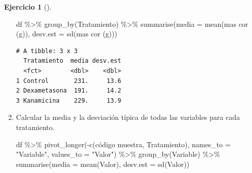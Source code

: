 \documentclass[
  a4paper,
]{scrreport}
\newenvironment{Shaded}{\begin{snugshade}}{\end{snugshade}}
\newcommand{\AttributeTok}[1]{\textcolor[rgb]{0.40,0.45,0.13}{#1}}
\newcommand{\FunctionTok}[1]{\textcolor[rgb]{0.28,0.35,0.67}{#1}}
\newcommand{\NormalTok}[1]{\textcolor[rgb]{0.00,0.23,0.31}{#1}}
\newcommand{\SpecialCharTok}[1]{\textcolor[rgb]{0.37,0.37,0.37}{#1}}
\newcommand{\StringTok}[1]{\textcolor[rgb]{0.13,0.47,0.30}{#1}}
\theoremstyle{definition}
\newtheorem{exercise}{Ejercicio}[chapter]
\theoremstyle{definition}
\theoremstyle{remark}
\begin{document}
\begin{exercise}[]
\begin{enumerate}
\begin{tcolorbox}
\begin{Shaded}
\begin{Highlighting}[]
\NormalTok{df }\SpecialCharTok{\%\textgreater{}\%}
    \FunctionTok{group\_by}\NormalTok{(Tratamiento) }\SpecialCharTok{\%\textgreater{}\%}
    \FunctionTok{summarise}\NormalTok{(}\AttributeTok{media =} \FunctionTok{mean}\NormalTok{(}\StringTok{\textasciigrave{}}\AttributeTok{mas cor (g)}\StringTok{\textasciigrave{}}\NormalTok{), }\AttributeTok{desv.est =} \FunctionTok{sd}\NormalTok{(}\StringTok{\textasciigrave{}}\AttributeTok{mas cor (g)}\StringTok{\textasciigrave{}}\NormalTok{))}
\end{Highlighting}
\end{Shaded}

\begin{verbatim}
# A tibble: 3 x 3
  Tratamiento  media desv.est
  <fct>        <dbl>    <dbl>
1 Control       231.     13.6
2 Dexametasona  191.     14.2
3 Kanamicina    229.     13.9
\end{verbatim}

  \end{tcolorbox}
\item
  Calcular la media y la desviación típica de todas las variables para
  cada tratamiento.

  \begin{tcolorbox}[enhanced jigsaw, title=\textcolor{quarto-callout-note-color}{\faInfo}\hspace{0.5em}{Solución}, titlerule=0mm, toprule=.15mm, colbacktitle=quarto-callout-note-color!10!white, arc=.35mm, colframe=quarto-callout-note-color-frame, opacitybacktitle=0.6, coltitle=black, left=2mm, colback=white, opacityback=0, breakable, bottomrule=.15mm, toptitle=1mm, leftrule=.75mm, bottomtitle=1mm, rightrule=.15mm]

\begin{Shaded}
\begin{Highlighting}[]
\NormalTok{df }\SpecialCharTok{\%\textgreater{}\%}
    \FunctionTok{pivot\_longer}\NormalTok{(}\SpecialCharTok{{-}}\FunctionTok{c}\NormalTok{(}\StringTok{\textasciigrave{}}\AttributeTok{código muestra}\StringTok{\textasciigrave{}}\NormalTok{, Tratamiento), }\AttributeTok{names\_to =} \StringTok{"Variable"}\NormalTok{, }\AttributeTok{values\_to =} \StringTok{"Valor"}\NormalTok{) }\SpecialCharTok{\%\textgreater{}\%}
    \FunctionTok{group\_by}\NormalTok{(Variable) }\SpecialCharTok{\%\textgreater{}\%}
    \FunctionTok{summarise}\NormalTok{(}\AttributeTok{media =} \FunctionTok{mean}\NormalTok{(Valor), }\AttributeTok{desv.est =} \FunctionTok{sd}\NormalTok{(Valor))}
\end{Highlighting}
\end{Shaded}


\end{tcolorbox}
\end{enumerate}
\end{exercise}
\end{document}
